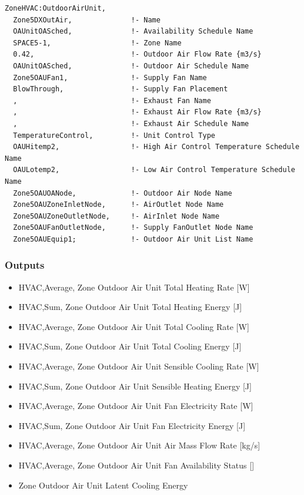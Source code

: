 \begin{lstlisting}
ZoneHVAC:OutdoorAirUnit,
  Zone5DXOutAir,              !- Name
  OAUnitOASched,              !- Availability Schedule Name
  SPACE5-1,                   !- Zone Name
  0.42,                       !- Outdoor Air Flow Rate {m3/s}
  OAUnitOASched,              !- Outdoor Air Schedule Name
  Zone5OAUFan1,               !- Supply Fan Name
  BlowThrough,                !- Supply Fan Placement
  ,                           !- Exhaust Fan Name
  ,                           !- Exhaust Air Flow Rate {m3/s}
  ,                           !- Exhaust Air Schedule Name
  TemperatureControl,         !- Unit Control Type
  OAUHitemp2,                 !- High Air Control Temperature Schedule Name
  OAULotemp2,                 !- Low Air Control Temperature Schedule Name
  Zone5OAUOANode,             !- Outdoor Air Node Name
  Zone5OAUZoneInletNode,      !- AirOutlet Node Name
  Zone5OAUZoneOutletNode,     !- AirInlet Node Name
  Zone5OAUFanOutletNode,      !- Supply FanOutlet Node Name
  Zone5OAUEquip1;             !- Outdoor Air Unit List Name
\end{lstlisting}

\subsubsection{Outputs}\label{outputs-5-012}

\begin{itemize}
\item
  HVAC,Average, Zone Outdoor Air Unit Total Heating Rate {[}W{]}
\item
  HVAC,Sum, Zone Outdoor Air Unit Total Heating Energy {[}J{]}
\item
  HVAC,Average, Zone Outdoor Air Unit Total Cooling Rate {[}W{]}
\item
  HVAC,Sum, Zone Outdoor Air Unit Total Cooling Energy {[}J{]}
\item
  HVAC,Average, Zone Outdoor Air Unit Sensible Cooling Rate {[}W{]}
\item
  HVAC,Sum, Zone Outdoor Air Unit Sensible Heating Energy {[}J{]}
\item
  HVAC,Average, Zone Outdoor Air Unit Fan Electricity Rate {[}W{]}
\item
  HVAC,Sum, Zone Outdoor Air Unit Fan Electricity Energy {[}J{]}
\item
  HVAC,Average, Zone Outdoor Air Unit Air Mass Flow Rate {[}kg/s{]}
\item
  HVAC,Average, Zone Outdoor Air Unit Fan Availability Status {[]}
\item
  Zone Outdoor Air Unit Latent Cooling Energy
\end{itemize}

